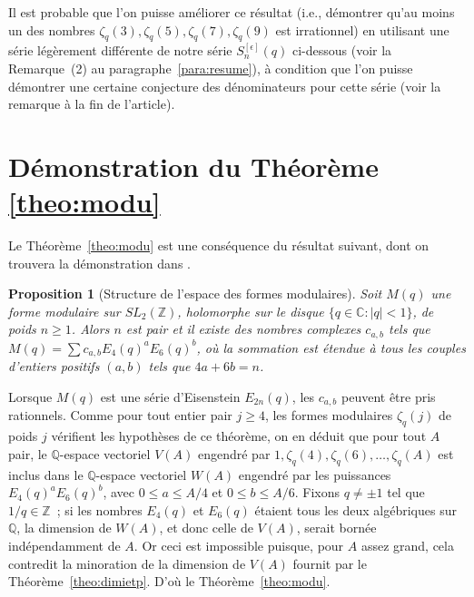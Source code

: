 \documentclass[12pt]{amsart}
\newcommand{\ep}{\epsilon}
\newcommand{\dis}{\displaystyle}
\newtheorem{prop}{Proposition}
\theoremstyle{remark}
\numberwithin{equation}{section}
\begin{document}
Il est probable que l'on puisse am{\'e}liorer ce r{\'e}sultat 
(i.e., d{\'e}montrer qu'au moins un des nombres $\zeta_q(3),\zeta_q(5),
\zeta_q(7),\zeta_q(9)$ est irrationnel) en 
utilisant une s{\'e}rie l{\'e}g{\`e}rement diff{\'e}rente de notre s{\'e}rie
$S_n^{[\ep]}(q)$ ci-dessous (voir la Remarque~(2) au 
paragraphe~\ref{para:resume}), {\`a} condition que l'on puisse d{\'e}montrer une certaine {\og 
conjecture des d{\'e}nominateurs\fg} pour cette s{\'e}rie (voir la remarque 
{\`a} la fin de l'article). 


\section{D{\'e}monstration du Th{\'e}or{\`e}me \ref{theo:modu}}
\label{sec:demotheomodu}
Le Th{\'e}or{\`e}me~\ref{theo:modu} est 
une cons{\'e}quence du r{\'e}sultat suivant, dont on trouvera la 
d{\'e}mon\-stra\-tion dans \cite{jps}.

\begin{prop}[\sc Structure de l'espace des formes modulaires] Soit $M(q)$ une
forme modulaire sur $SL_2(\mathbb{Z})$, holomorphe sur le disque   
$\{q\in \mathbb{C} : \vert q\vert  <1\}$,  de poids $n\ge 1$. Alors $n$ est pair et il 
existe des nombres complexes 
$c_{a,b}$ tels que 
$
\dis M(q)=\sum c_{a,b}E_4(q)^aE_6(q)^b
$,   
o{\`u} la sommation est {\'e}tendue {\`a} tous les couples d'entiers 
positifs $(a,b)$ tels que $4a+6b=n$.
\end{prop}

Lorsque $M(q)$ est une s{\'e}rie d'Eisenstein $E_{2n}(q)$, les  $c_{a,b}$ 
peuvent {\^e}tre pris rationnels. Comme pour tout entier pair $j\ge 4$, 
les formes modulaires $\zeta_q(j)$ de poids $j$ v{\'e}rifient 
les hypoth{\`e}ses de 
ce th{\'e}or{\`e}me, on en d{\'e}duit  
que pour tout $A$ pair, le $\mathbb{Q}$-espace vectoriel $V(A)$ engendr{\'e} 
par $1, \zeta_q(4), 
\zeta_q(6), \ldots, \zeta_q(A)$ est inclus dans le $\mathbb{Q}$-espace 
vectoriel $W(A)$ 
engendr{\'e} par les puissances 
$E_4(q)^aE_6(q)^b$, avec $0\le a\le A/4$ et $0\le b\le A/6$. 
Fixons $q\not =\pm1$ tel que $1/q\in\mathbb{Z}$~; si les nombres $E_4(q)$ 
et $E_6(q)$ {\'e}taient 
tous les deux alg{\'e}briques sur $\mathbb{Q}$, la dimension de $W(A)$, et donc 
celle de $V(A)$, serait born{\'e}e 
ind{\'e}pendamment de $A$. Or ceci est impossible puisque, pour $A$ assez grand, 
cela contredit 
la minoration de la dimension de $V(A)$ fournit par le
Th{\'e}or{\`e}me~\ref{theo:dimietp}. D'o{\`u} le 
Th{\'e}or{\`e}me~\ref{theo:modu}.
\end{document}

